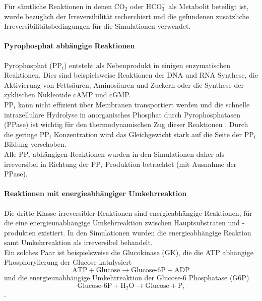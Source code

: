 Für sämtliche Reaktionen in denen $\text{CO}_2$ oder $\text{HCO}_3^-$ als Metabolit beteiligt ist, wurde bezüglich der Irreversibilität recherchiert und die gefundenen zusätzliche Irreversibilitätsbedingungen für die Simulationen verwendet.

\paragraph{Pyrophosphat abhängige Reaktionen}
Pyrophosphat ($\text{PP}_i$) entsteht als Nebenprodukt in einigen enzymatischen Reaktionen. Dies sind beispielsweise Reaktionen der DNA und RNA Synthese, die Aktivierung von Fettsäuren, Aminosäuren und Zuckern oder die Synthese der zyklischen Nukleotide cAMP und cGMP.\\
$\text{PP}_i$ kann nicht effizient über Membranen transportiert werden und die schnelle intrazelluläre Hydrolyse in anorganisches Phosphat durch Pyrophosphatasen (PPase) ist wichtig für den thermodynamischen Zug dieser Reaktionen \cite{Curbo2006}. Durch die geringe $\text{PP}_i$ Konzentration wird das Gleichgewicht stark auf die Seite der $\text{PP}_i$ Bildung verschoben.\\
Alle $\text{PP}_i$ abhängigen Reaktionen wurden in den Simulationen daher als irreversibel in Richtung der $\text{PP}_i$ Produktion betrachtet (mit Ausnahme der PPase).

\paragraph{Reaktionen mit energieabhängiger Umkehrreaktion}
Die dritte Klasse irreversibler Reaktionen sind energieabhängige Reaktionen, für die eine energieunabhängige Umkehrreaktion zwischen Hauptsubstraten und -produkten existiert. In den Simulationen wurden die energieabhängige Reaktion samt Umkehrreaktion als irreversibel behandelt.\\
Ein solches Paar ist beispielsweise die Glucokinase (GK), die die ATP abhängige Phosphorylierung der Glucose katalysiert
\begin{equation*}
\text{ATP} + \text{Glucose} \rightarrow \text{Glucose-6P} + \text{ADP}
\end{equation*}
und die energieunabhängige Umkehrreaktion der Glucose-6 Phosphatase (G6P)
\begin{equation*}
\text{Glucose-6P} + \text{H}_2\text{O} \rightarrow \text{Glucose} + \text{P}_i
\end{equation*}.

